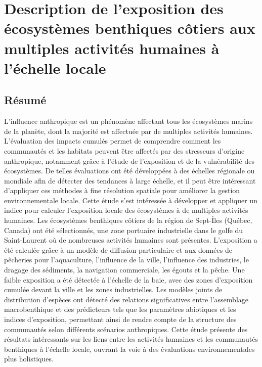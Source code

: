 \chapter{Description de l'exposition des écosystèmes benthiques côtiers aux multiples activités humaines à l'échelle locale}
\label{chap3}

\section{Résumé}
L'influence anthropique est un phénomène affectant tous les écosystèmes marins de la planète, dont la majorité est affectuée par de multiples activités humaines. L'évaluation des impacts cumulés permet de comprendre comment les communautés et les habitats peuvent être affectés par des stresseurs d'origine anthropique, notamment grâce à l'étude de l'exposition et de la vulnérabilité des écosystèmes. De telles évaluations ont été développées à des échelles régionale ou mondiale afin de détecter des tendances à large échelle, et il peut être intéressant d'appliquer ces méthodes à fine résolution spatiale pour améliorer la gestion environnementale locale. Cette étude s'est intéressée à développer et appliquer un indice pour calculer l'exposition locale des écosystèmes à de multiples activités humaines. Les écosystèmes benthiques côtiers de la région de Sept-Îles (Québec, Canada) ont été sélectionnés, une zone portuaire industrielle dans le golfe du Saint-Laurent où de nombreuses activités humaines sont présentes. L'exposition a été calculée grâce à un modèle de diffusion particulaire et aux données de pêcheries pour l'aquaculture, l'influence de la ville, l'influence des industries, le dragage des sédiments, la navigation commerciale, les égouts et la pêche. Une faible exposition a été détectée à l'échelle de la baie, avec des zones d'exposition cumulée devant la ville et les zones industrielles. Les modèles joints de distribution d'espèces ont détecté des relations significatives entre l'assemblage macrobenthique et des prédicteurs tels que les paramètres abiotiques et les indices d'exposition, permettant ainsi de rendre compte de la structure des communautés selon différents scénarios anthropiques. Cette étude présente des résultats intéressants sur les liens entre les activités humaines et les communautés benthiques à l'échelle locale, ouvrant la voie à des évaluations environnementales plus holistiques. \linebreak[4]

